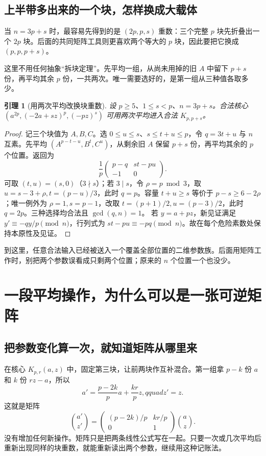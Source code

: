 \documentclass[11pt,a4paper,oneside,openany]{book}
\newtheorem{lemma}[theorem]{引理}
\theoremstyle{definition}
\numberwithin{equation}{chapter}
\begin{document}
\section{上半带多出来的一个块，怎样换成大载体}
当 $n=3p+s$ 时，最容易先得到的是 $(2p,p,s)$ 重数：三个完整 $p$ 块先折叠出一个 $2p$ 块。后面的共同矩阵工具则更喜欢两个等大的 $p$ 块，因此要把它换成 $(p,p,p+s)$。

这里不用任何抽象“拆块定理”。先平均一组，从尚未用掉的旧 $A$ 中留下 $p+s$ 份，再平均其余 $p$ 份，一共两次。唯一需要选好的，是第一组从三种值各取多少。
\begin{lemma}[用两次平均改换块重数]\label{lem:shape-change}
设 $p\ge5$、$1\le s<p$、$n=3p+s$。合法核心 $(a^{2p},(-2a+sz)^p,(-pz)^s)$ 可用两次平均进入合法 $K_{p,p+s}$。
\end{lemma}
\begin{proof}
记三个块值为 $A,B,C$。选 $0\le u\le s$、$s\le t+u\le p$，令 $q=3t+u$ 与 $n$ 互素。先平均 $(A^{p-t-u},B^t,C^u)$，从剩余旧 $A$ 保留 $p+s$ 份，再平均其余的 $p$ 个位置。返回为
\[
\frac1p\begin{pmatrix}p-q&st-pu\\-1&0\end{pmatrix}.
\]
可取 $(t,u)=(s,0)$（$3\nmid s$）；若 $3\mid s$，令 $\rho=p\bmod3$，取 $u=s-3+\rho,t=(p-u)/3$，此时 $q=p$。容量 $t+u\ge s$ 等价于 $p-s\ge6-2\rho$；唯一例外为 $\rho=1,s=p-1$，改取 $t=(p+1)/2,u=(p-3)/2$，此时 $q=2p$。三种选择均合法且 $\gcd(q,n)=1$。
若 $y=a+pz$，新见证满足 $y'\equiv-qy/p\pmod n$，行列式为 $st-pu\equiv-pq\pmod n$。故在每个危险素数处保持本原性及见证。
\end{proof}
到这里，任意合法输入已经被送入一个覆盖全部位置的二维参数族。后面用矩阵工作时，别把两个参数误看成只剩两个位置；原来的 $n$ 个位置一个也没少。

\chapter{一段平均操作，为什么可以是一张可逆矩阵}\label{sec:arithmetic}
\section{把参数变化算一次，就知道矩阵从哪里来}
在核心 $K_{p,r}(a,z)$ 中，固定第三块，让前两块作互补混合。第一组拿 $p-k$ 份 $a$ 和 $k$ 份 $rz-a$，所以
\[a'=\frac{p-2k}{p}a+\frac{kr}{p}z,qquad z'=z.
\]
这就是矩阵
\[\binom{a'}{z'}=
\begin{pmatrix}(p-2k)/p&kr/p\\0&1\end{pmatrix}\binom az.
\]
没有增加任何新操作。矩阵只是把两条线性公式写在一起。只要一次或几次平均后重新出现同样的块重数，就能重新读出两个参数，继续用这种记账法。
\end{document}
